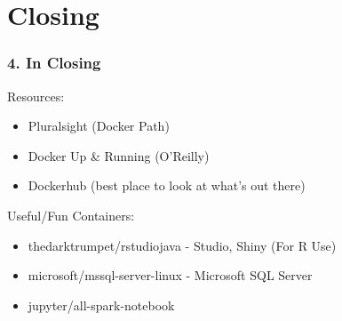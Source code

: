 \documentclass{beamer}
\begin{document}
\section{Closing}
\begin{frame}
    \frametitle{4. In Closing}
    Resources:
    \begin{itemize}
        \item Pluralsight (Docker Path)
        \item Docker Up \& Running (O'Reilly)
        \item Dockerhub (best place to look at what's out there)
    \end{itemize}
    Useful/Fun Containers:
    \begin{itemize}
        \item thedarktrumpet/rstudiojava - Studio, Shiny (For R Use)
        \item microsoft/mssql-server-linux - Microsoft SQL Server
        \item jupyter/all-spark-notebook
    \end{itemize}
\end{frame}
\end{document}
